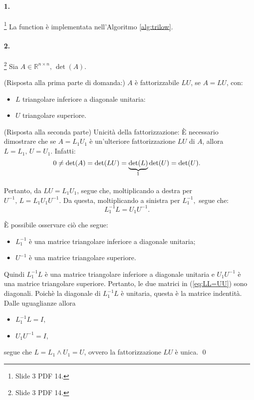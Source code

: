 \paragraph{1.}\footnote{Slide 3 PDF 14.} La function è implementata nell'Algoritmo \ref{alg:trilow}.

\paragraph{2.}\footnote{Slide 3 PDF 14.} Sia $A\in\mathbb R^{n\times n},\, \det(A).$

\noindent (Risposta alla prima parte di domanda:) $A$ è fattorizzabile $LU$, se $A=LU$, con:
\begin{itemize}
    \item $L$ triangolare inferiore a diagonale unitaria:
    \item $U$ triangolare superiore.
\end{itemize}

\noindent (Risposta alla seconda parte) Unicità della fattorizzazione: È necessario dimostrare che se $A=L_1U_1$ è un'ulteriore fattorizzazione $LU$ di $A$, allora $L=L_1,\, U=U_1.$ Infatti:
\begin{equation*}
    0\neq\det(A)=\det(LU)=\underbrace{\det(L)}_{\footnotemark}\det(U)=\det(U).
\end{equation*}

\noindent Pertanto, da $LU=L_1U_1$, segue che, moltiplicando a destra per $U^{-1},\, L=L_1U_1U^{-1}.$ Da questa, moltiplicando a sinistra per $L_1^{-1},$ segue che:
\begin{equation}\label{eq:LL=UU}
    L_1^{-1}L=U_1U^{-1}.
\end{equation}

\noindent È possibile osservare ciò che segue:
\begin{itemize}
    \item $L_1^{-1}$ è una matrice triangolare inferiore a diagonale unitaria;
    \item  $U^{-1}$ è una matrice triangolare superiore.
\end{itemize}

\noindent Quindi $L_1^{-1}L$ è una matrice triangolare inferiore a diagonale unitaria e $U_1U^{-1}$ è una matrice triangolare superiore. Pertanto, le due matrici in (\ref{eq:LL=UU}) sono diagonali. Poichè la diagonale di $L_1^{-1}L$ è unitaria, questa è la matrice indentità. Dalle uguaglianze allora 
\begin{itemize}
    \item $L_1^{-1}L=I$,
    \item $U_1U^{-1}=I$,
\end{itemize}
segue che $L=L_1\wedge U_1=U$, ovvero la fattorizzazione $LU$ è unica. \qed

